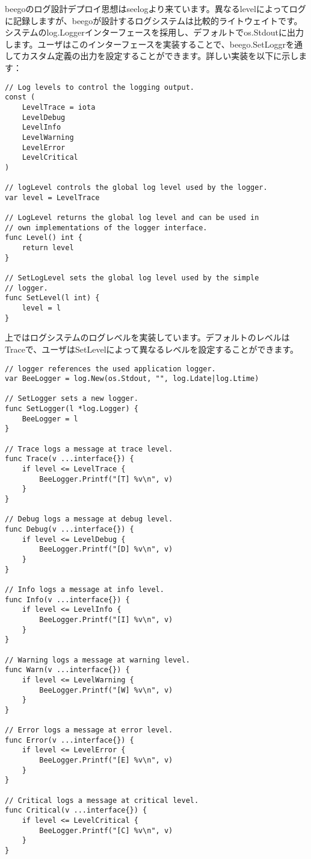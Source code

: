 beegoのログ設計デプロイ思想はseelogより来ています。異なるlevelによってログに記録しますが、beegoが設計するログシステムは比較的ライトウェイトです。システムのlog.Loggerインターフェースを採用し、デフォルトでos.Stdoutに出力します。ユーザはこのインターフェースを実装することで、beego.SetLoggrを通してカスタム定義の出力を設定することができます。詳しい実装を以下に示します：


\begin{lstlisting}[numbers=none]
// Log levels to control the logging output.
const (
    LevelTrace = iota
    LevelDebug
    LevelInfo
    LevelWarning
    LevelError
    LevelCritical
)

// logLevel controls the global log level used by the logger.
var level = LevelTrace

// LogLevel returns the global log level and can be used in
// own implementations of the logger interface.
func Level() int {
    return level
}

// SetLogLevel sets the global log level used by the simple
// logger.
func SetLevel(l int) {
    level = l
}
\end{lstlisting}

上ではログシステムのログレベルを実装しています。デフォルトのレベルはTraceで、ユーザはSetLevelによって異なるレベルを設定することができます。

\begin{lstlisting}[numbers=none]
// logger references the used application logger.
var BeeLogger = log.New(os.Stdout, "", log.Ldate|log.Ltime)

// SetLogger sets a new logger.
func SetLogger(l *log.Logger) {
    BeeLogger = l
}

// Trace logs a message at trace level.
func Trace(v ...interface{}) {
    if level <= LevelTrace {
        BeeLogger.Printf("[T] %v\n", v)
    }
}

// Debug logs a message at debug level.
func Debug(v ...interface{}) {
    if level <= LevelDebug {
        BeeLogger.Printf("[D] %v\n", v)
    }
}

// Info logs a message at info level.
func Info(v ...interface{}) {
    if level <= LevelInfo {
        BeeLogger.Printf("[I] %v\n", v)
    }
}

// Warning logs a message at warning level.
func Warn(v ...interface{}) {
    if level <= LevelWarning {
        BeeLogger.Printf("[W] %v\n", v)
    }
}

// Error logs a message at error level.
func Error(v ...interface{}) {
    if level <= LevelError {
        BeeLogger.Printf("[E] %v\n", v)
    }
}

// Critical logs a message at critical level.
func Critical(v ...interface{}) {
    if level <= LevelCritical {
        BeeLogger.Printf("[C] %v\n", v)
    }
}
\end{lstlisting}


